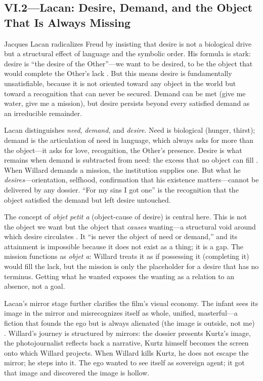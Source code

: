 \subsection*{VI.2—Lacan: Desire, Demand, and the Object That Is Always Missing}
\label{ssec:vi-lacan}

Jacques Lacan radicalizes Freud by insisting that desire is not a biological drive but a 
structural effect of language and the symbolic order. His formula is stark: desire is ``the 
desire of the Other''---we want to be desired, to be the object that would complete the 
Other's lack \parencite{LacanEcrits2006}. But this means desire is fundamentally 
unsatisfiable, because it is not oriented toward any object in the world but toward a 
recognition that can never be secured. Demand can be met (give me water, give me a mission), 
but desire persists beyond every satisfied demand as an irreducible remainder.

Lacan distinguishes \emph{need}, \emph{demand}, and \emph{desire}. Need is biological (hunger, 
thirst); demand is the articulation of need in language, which always asks for more than the 
object---it asks for love, recognition, the Other's presence. Desire is what remains when 
demand is subtracted from need: the excess that no object can fill 
\parencite{LacanEcrits2006}. When Willard demands a mission, the institution supplies one. But 
what he \emph{desires}---orientation, selfhood, confirmation that his existence 
matters---cannot be delivered by any dossier. ``For my sins I got one'' is the recognition 
that the object satisfied the demand but left desire untouched.

The concept of \emph{objet petit a} (object-cause of desire) is central here. This is not the 
object we want but the object that \emph{causes} wanting---a structural void around which 
desire circulates \parencite[p.~103]{LacanSeminarXI1991}. It ``is never the object of need or 
demand,'' and its attainment is impossible because it does not exist as a thing; it is a gap. 
The mission functions as \emph{objet a}: Willard treats it as if possessing it (completing it) 
would fill the lack, but the mission is only the placeholder for a desire that has no 
terminus. Getting what he wanted exposes the wanting as a relation to an absence, not a goal.

Lacan's mirror stage further clarifies the film's visual economy. The infant sees its image in 
the mirror and misrecognizes itself as whole, unified, masterful---a fiction that founds the 
ego but is always alienated (the image is outside, not me) \parencite{LacanEcrits2006}. 
Willard's journey is structured by mirrors: the dossier presents Kurtz's image, the 
photojournalist reflects back a narrative, Kurtz himself becomes the screen onto which Willard 
projects. When Willard kills Kurtz, he does not escape the mirror; he steps into it. The ego 
wanted to see itself as sovereign agent; it got that image and discovered the image is hollow.

